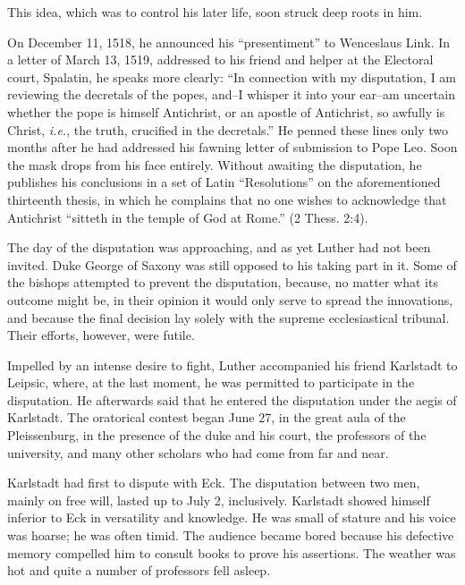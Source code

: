 This idea, which was to control his later life, soon struck deep roots
in him.

On December 11, 1518, he announced his “presentiment” to Wenceslaus
Link. In a letter of March 13, 1519, addressed to his friend and
helper at the Electoral court, Spalatin, he speaks more clearly: “In
connection with my disputation, I am reviewing the decretals of the
popes, and--I whisper it into your ear--am uncertain whether the
pope is himself Antichrist, or an apostle of Antichrist, so awfully is
Christ, \textit{i.e.}, the truth, crucified in the decretals.” He penned these
lines only two months after he had addressed his fawning letter of
submission to Pope Leo. Soon the mask drops from his face entirely.
Without awaiting the disputation, he publishes his conclusions in a
set of Latin “Resolutions” on the aforementioned thirteenth thesis, in
which he complains that no one wishes to acknowledge that Antichrist
“sitteth in the temple of God at Rome.” (2 Thess. 2:4).

The day of the disputation was approaching, and as yet Luther had
not been invited. Duke George of Saxony was still opposed to his
taking part in it. Some of the bishops attempted to prevent the disputation,
because, no matter what its outcome might be, in their opinion
it would only serve to spread the innovations, and because the final
decision lay solely with the supreme ecclesiastical tribunal. Their
efforts, however, were futile.

Impelled by an intense desire to fight,
Luther accompanied his friend Karlstadt to Leipsic, where, at the
last moment, he was permitted to participate in the disputation.
He afterwards said that he entered the disputation under the aegis
of Karlstadt. The oratorical
contest began June 27, in the great aula of the Pleissenburg, in the
presence of the duke and his court, the professors of the university,
and many other scholars who had come from far and near.

Karlstadt had first to dispute with Eck. The disputation between
two men, mainly on free will, lasted up to July 2, inclusively.
Karlstadt showed himself inferior to Eck in versatility and knowledge.
He was small of stature and his voice was hoarse; he was often
timid. The audience became bored because his defective memory
compelled him to consult books to prove his assertions. The weather
was hot and quite a number of professors fell asleep.

